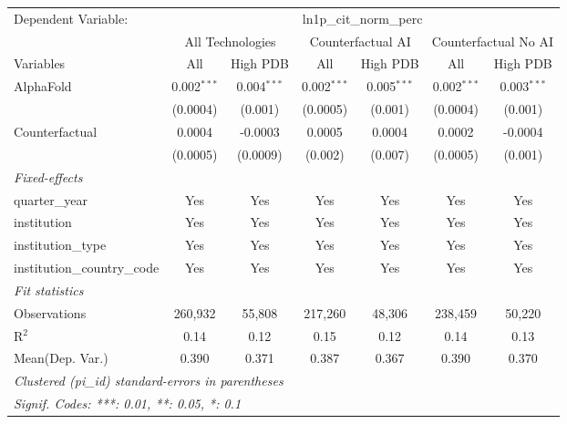 \begingroup
\centering
\begin{tabular}{lcccccc}
   \tabularnewline \midrule \midrule
   Dependent Variable: & \multicolumn{6}{c}{ln1p\_cit\_norm\_perc}\\
 & \multicolumn{2}{c}{All Technologies} & \multicolumn{2}{c}{Counterfactual AI} & \multicolumn{2}{c}{Counterfactual No AI} \\
\cmidrule(lr){1-1}\cmidrule(lr){2-3} \cmidrule(lr){4-5} \cmidrule(lr){6-7}
Variables & \multicolumn{1}{c}{All} & \multicolumn{1}{c}{High PDB} & \multicolumn{1}{c}{All} & \multicolumn{1}{c}{High PDB} & \multicolumn{1}{c}{All} & \multicolumn{1}{c}{High PDB} \\
\cmidrule(lr){1-1}\cmidrule(lr){2-2} \cmidrule(lr){3-3} \cmidrule(lr){4-4} \cmidrule(lr){5-5} \cmidrule(lr){6-6} \cmidrule(lr){7-7}
   AlphaFold                    & 0.002$^{***}$ & 0.004$^{***}$ & 0.002$^{***}$ & 0.005$^{***}$ & 0.002$^{***}$ & 0.003$^{***}$\\   
                                & (0.0004)      & (0.001)       & (0.0005)      & (0.001)       & (0.0004)      & (0.001)\\   
   Counterfactual               & 0.0004        & -0.0003       & 0.0005        & 0.0004        & 0.0002        & -0.0004\\   
                                & (0.0005)      & (0.0009)      & (0.002)       & (0.007)       & (0.0005)      & (0.001)\\   
   \midrule
   \emph{Fixed-effects}\\
   quarter\_year                & Yes           & Yes           & Yes           & Yes           & Yes           & Yes\\  
   institution                  & Yes           & Yes           & Yes           & Yes           & Yes           & Yes\\  
   institution\_type            & Yes           & Yes           & Yes           & Yes           & Yes           & Yes\\  
   institution\_country\_code   & Yes           & Yes           & Yes           & Yes           & Yes           & Yes\\  
   \midrule
   \emph{Fit statistics}\\
   Observations                 & 260,932       & 55,808        & 217,260       & 48,306        & 238,459       & 50,220\\  
   R$^2$                        & 0.14          & 0.12          & 0.15          & 0.12          & 0.14          & 0.13\\  
Mean(Dep. Var.) & 0.390 & 0.371 & 0.387 & 0.367 & 0.390 & 0.370 \\
   \midrule \midrule
   \multicolumn{7}{l}{\emph{Clustered (pi\_id) standard-errors in parentheses}}\\
   \multicolumn{7}{l}{\emph{Signif. Codes: ***: 0.01, **: 0.05, *: 0.1}}\\
\end{tabular}
\par\endgroup
